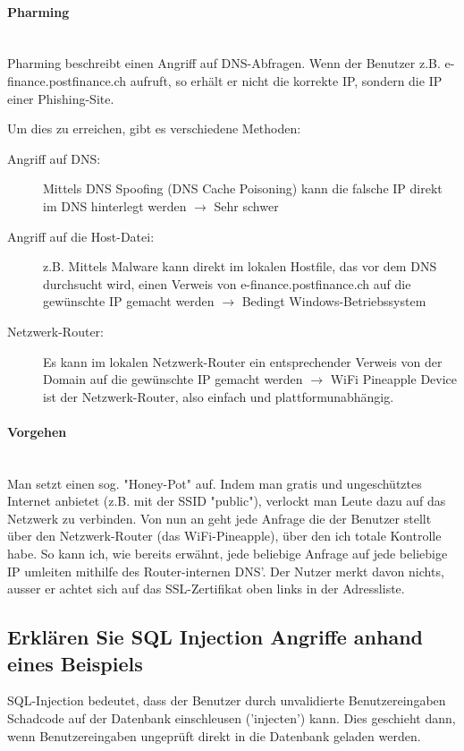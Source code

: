\documentclass[a4paper, 11pt, nofootinbib]{article}
\begin{document}
\paragraph{Pharming}\mbox{}\\
Pharming beschreibt einen Angriff auf DNS-Abfragen. Wenn der Benutzer z.B. e-finance.postfinance.ch aufruft, so erhält er nicht die korrekte IP, sondern die IP einer Phishing-Site.

\vspace{10px}

\noindent Um dies zu erreichen, gibt es verschiedene Methoden:

\begin{description}
	\item [Angriff auf DNS: ] Mittels DNS Spoofing (DNS Cache Poisoning) kann die falsche IP direkt im DNS hinterlegt werden $\rightarrow$ Sehr schwer
	\item [Angriff auf die Host-Datei: ] z.B. Mittels Malware kann direkt im lokalen Hostfile, das vor dem DNS durchsucht wird, einen Verweis von e-finance.postfinance.ch auf die gewünschte IP gemacht werden $\rightarrow$ Bedingt Windows-Betriebssystem
	\item[Netzwerk-Router: ] Es kann im lokalen Netzwerk-Router ein entsprechender Verweis von der Domain auf die gewünschte IP gemacht werden $\rightarrow$ WiFi Pineapple Device ist der Netzwerk-Router, also einfach und plattformunabhängig.
\end{description}

\paragraph{Vorgehen}\mbox{}\\
Man setzt einen sog. "Honey-Pot" auf. Indem man gratis und ungeschütztes Internet anbietet (z.B. mit der SSID "public"), verlockt man Leute dazu auf das Netzwerk zu verbinden. Von nun an geht jede Anfrage die der Benutzer stellt über den Netzwerk-Router (das WiFi-Pineapple), über den ich totale Kontrolle habe. So kann ich, wie bereits erwähnt, jede beliebige Anfrage auf jede beliebige IP umleiten mithilfe des Router-internen DNS'. Der Nutzer merkt davon nichts, ausser er achtet sich auf das SSL-Zertifikat oben links in der Adressliste.

\newpage

\subsection{Erklären Sie SQL Injection Angriffe anhand eines Beispiels}
SQL-Injection bedeutet, dass der Benutzer durch unvalidierte Benutzereingaben Schadcode auf der Datenbank einschleusen ('injecten') kann. Dies geschieht dann, wenn Benutzereingaben ungeprüft direkt in die Datenbank geladen werden.
\end{document}
